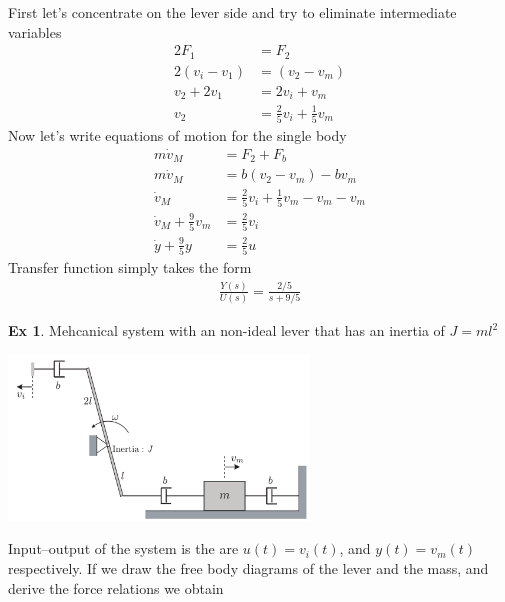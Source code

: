 \documentclass[twoside]{article}
\theoremstyle{definition}
\newtheorem{exmp}[theorem]{Ex}
\begin{document}
First let's concentrate on the lever side and try to eliminate
intermediate variables
%
\begin{align*}
  2 F_1 &= F_2  \\
  2 (v_i - v_1)  &= (v_2 - v_m) \\
  v_2 + 2 v_1 &= 2 v_i + v_m  \\
  v_2 &= \frac{2}{5} v_i + \frac{1}{5} v_m            
\end{align*}
%
Now let's write equations of motion for the single body
%
\begin{align*}
  m \dot{v}_M &= F_2 + F_b \\
  m \dot{v}_M &= b ( v_2 - v_m ) - b v_m \\
  \dot{v}_M &=  \frac{2}{5} v_i + \frac{1}{5} v_m  - v_m - v_m \\
  \dot{v}_M + \frac{9}{5} v_m &=  \frac{2}{5} v_i \\
   \dot{y} + \frac{9}{5} y &=  \frac{2}{5} u
\end{align*}
%
Transfer function simply takes the form
%
\begin{align*}
  \frac{Y(s)}{U(s)} = \frac{2/5}{s + 9/5}
\end{align*}
%

\begin{exmp}
Mehcanical system with an non-ideal lever that has an inertia of $J = m l^2$
\end{exmp}

\vspace{6pt}
  
\begin{minipage}[h]{1\linewidth}
    \begin{center}
      \includegraphics[width=0.6\textwidth]{lever}
    \end{center}
\end{minipage}   

\vspace{6pt}

Input--output of the system is the are $u(t) = v_i(t)$, and
$y(t) = v_m(t)$ respectively. If we draw the free body diagrams of
the lever and the mass, and derive the force relations we obtain
\end{document}
